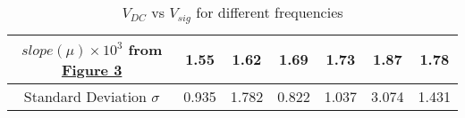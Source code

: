 \begin{table}[H]
{\begin{tabular}{|ccc|cccccc|}
	\multicolumn{3}{|c|}{$slope(\mu) \times10^{3}$   from \href{graph:1}{Figure 3}} & \multicolumn{1}{c|}{1.55} & \multicolumn{1}{c|}{1.62} & \multicolumn{1}{c|}{1.69} & \multicolumn{1}{c|}{1.73} & \multicolumn{1}{c|}{1.87} & 1.78 \\ \hline
	\multicolumn{3}{|c|}{Standard Deviation $\sigma$} & \multicolumn{1}{c|}{0.935} & \multicolumn{1}{c|}{1.782} & \multicolumn{1}{c|}{0.822} & \multicolumn{1}{c|}{1.037} & \multicolumn{1}{c|}{3.074} & 1.431 \\ \hline
	\end{tabular}%
	}
	\label{tab:1}
	\caption{$V_{DC}$ vs $V_{sig}$ for different frequencies}
\end{table}